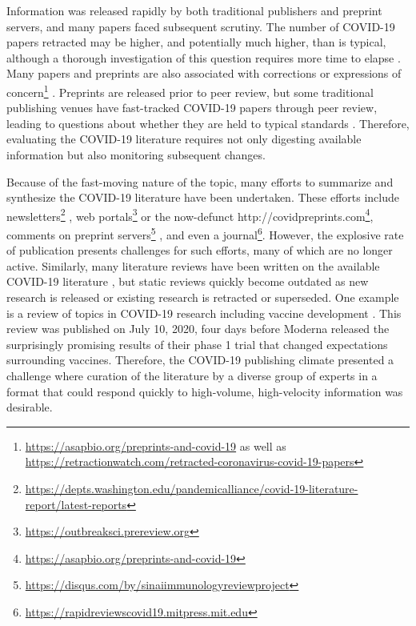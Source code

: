 \documentclass[twocolumn]{ceurart}
\begin{document}
Information was released rapidly by both traditional publishers and preprint servers, and many papers faced subsequent scrutiny.
The number of COVID-19 papers retracted may be higher, and potentially much higher, than is typical, although a thorough investigation of this question requires more time to elapse \citep{ZUk10707, caxpZEmy}.
Many papers and preprints are also associated with corrections or expressions of concern\footnote{\url{https://asapbio.org/preprints-and-covid-19} as well as \url{https://retractionwatch.com/retracted-coronavirus-covid-19-papers}} \citep{caxpZEmy}.
Preprints are released prior to peer review, but some traditional publishing venues have fast-tracked COVID-19 papers through peer review, leading to questions about whether they are held to typical standards \citep{1Dez1ZOc5}.
Therefore, evaluating the COVID-19 literature requires not only digesting available information but also monitoring subsequent changes.

Because of the fast-moving nature of the topic, many efforts to summarize and synthesize the COVID-19 literature have been undertaken.
These efforts include newsletters\footnote{\url{https://depts.washington.edu/pandemicalliance/covid-19-literature-report/latest-reports}} \citep{JdWiPJCL}, web portals\footnote{\url{https://outbreaksci.prereview.org}} \citep{1CBWvhTdy} or the now-defunct http://covidpreprints.com\footnote{\url{https://asapbio.org/preprints-and-covid-19}}, comments on preprint servers\footnote{\url{https://disqus.com/by/sinaiimmunologyreviewproject}} \citep{YZ4cHNuH}, and even a journal\footnote{\url{https://rapidreviewscovid19.mitpress.mit.edu}}.
However, the explosive rate of publication presents challenges for such efforts, many of which are no longer active.
Similarly, many literature reviews have been written on the available COVID-19 literature \citep{I2EsJmfs, evtsR3C5, 18eCxyLhx, SAE5ME3N, xOs5ctsW}, but static reviews quickly become outdated as new research is released or existing research is retracted or superseded.
One example is a review of topics in COVID-19 research including vaccine development \citep{xOs5ctsW}.
This review was published on July 10, 2020, four days before Moderna released the surprisingly promising results of their phase 1 trial \citep{wiGjCZC8} that changed expectations surrounding vaccines.
Therefore, the COVID-19 publishing climate presented a challenge where curation of the literature by a diverse group of experts in a format that could respond quickly to high-volume, high-velocity information was desirable.
\end{document}
